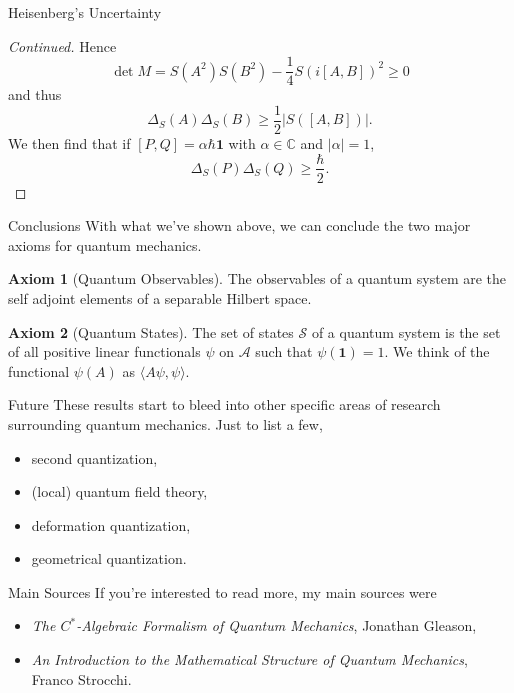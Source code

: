 \documentclass[pdf]{beamer}
\theoremstyle{definition}
\theoremstyle{theorem}
\newtheorem*{axiom}{Axiom}
\newcommand{\A}{\mathcal{A}}
\newcommand{\C}{\mathbb{C}}
\begin{document}
	\begin{frame}{Heisenberg's Uncertainty}
	\begin{proof}[Continued]
	Hence
	\[
	\det M = S(A^2)S(B^2)-\frac{1}{4}S(i[A,B])^2\geq 0
	\]
	and thus
	\[
	\Delta_S(A)\Delta_S(B)\geq \frac{1}{2} |S([A,B])|.
	\]
	We then find that if $[P,Q]=\alpha \hbar \mathbf{1}$ with $\alpha \in \C$ and $|\alpha|=1$,
	\[
	\Delta_S(P)\Delta_S(Q)\geq \frac{\hbar}{2}.
	\]
	\end{proof}
	\end{frame}
	
	\begin{frame}{Conclusions}
	With what we've shown above, we can conclude the two major axioms for quantum mechanics. 
	\begin{axiom}[Quantum Observables]
	The observables of a quantum system are the self adjoint elements of a separable Hilbert space.
	\end{axiom}
	\begin{axiom}[Quantum States]
	The set of states $\mathcal{S}$ of a quantum system is the set of all positive linear functionals $\psi$ on $\A$ such that $\psi(\mathbf{1})=1$. We think of the functional $\psi(A)$ as $\langle A\psi, \psi\rangle$.
	\end{axiom}
	\end{frame}
	
	\begin{frame}{Future}
	These results start to bleed into other specific areas of research surrounding quantum mechanics.  Just to list a few,
	\begin{itemize}
	\item second quantization,
	\item (local) quantum field theory,
	\item deformation quantization,
	\item geometrical quantization.
	\end{itemize}
	\end{frame}
	
	\begin{frame}{Main Sources}
	If you're interested to read more, my main sources were
	\begin{itemize}
	\item \emph{The $C^*$-Algebraic Formalism of Quantum Mechanics}, Jonathan Gleason,
	\item \emph{An Introduction to the Mathematical Structure of Quantum Mechanics}, Franco Strocchi.
	\end{itemize}
	\end{frame}

	
	
	
\end{document}
